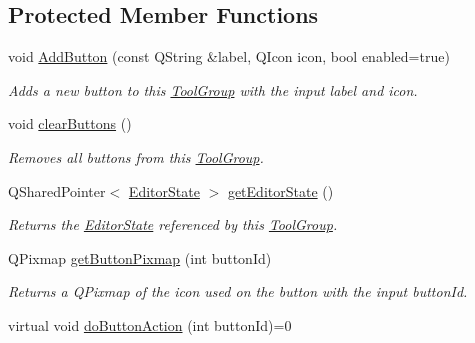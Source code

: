 \subsection*{Protected Member Functions}
\begin{DoxyCompactItemize}
\item 
void \hyperlink{class_tool_group_a5c64e3a5d2932696cf79603664026d78}{Add\-Button} (const Q\-String \&label, Q\-Icon icon, bool enabled=true)
\begin{DoxyCompactList}\small\item\em Adds a new button to this \hyperlink{class_tool_group}{Tool\-Group} with the input label and icon. \end{DoxyCompactList}\item 
\hypertarget{class_tool_group_a05a293e731bb1fa8eff34ba0287fcaaf}{void \hyperlink{class_tool_group_a05a293e731bb1fa8eff34ba0287fcaaf}{clear\-Buttons} ()}\label{class_tool_group_a05a293e731bb1fa8eff34ba0287fcaaf}

\begin{DoxyCompactList}\small\item\em Removes all buttons from this \hyperlink{class_tool_group}{Tool\-Group}. \end{DoxyCompactList}\item 
\hypertarget{class_tool_group_a97f25560443b3690840eafec703d02f6}{Q\-Shared\-Pointer$<$ \hyperlink{class_editor_state}{Editor\-State} $>$ \hyperlink{class_tool_group_a97f25560443b3690840eafec703d02f6}{get\-Editor\-State} ()}\label{class_tool_group_a97f25560443b3690840eafec703d02f6}

\begin{DoxyCompactList}\small\item\em Returns the \hyperlink{class_editor_state}{Editor\-State} referenced by this \hyperlink{class_tool_group}{Tool\-Group}. \end{DoxyCompactList}\item 
\hypertarget{class_tool_group_abe47ad522a7f0ca0d5e222fade47f77a}{Q\-Pixmap \hyperlink{class_tool_group_abe47ad522a7f0ca0d5e222fade47f77a}{get\-Button\-Pixmap} (int button\-Id)}\label{class_tool_group_abe47ad522a7f0ca0d5e222fade47f77a}

\begin{DoxyCompactList}\small\item\em Returns a Q\-Pixmap of the icon used on the button with the input button\-Id. \end{DoxyCompactList}\item 
\hypertarget{class_tool_group_a749e84cf4dfdf68033b44aa0b4cb7734}{virtual void \hyperlink{class_tool_group_a749e84cf4dfdf68033b44aa0b4cb7734}{do\-Button\-Action} (int button\-Id)=0}\label{class_tool_group_a749e84cf4dfdf68033b44aa0b4cb7734}


\end{DoxyCompactItemize}
